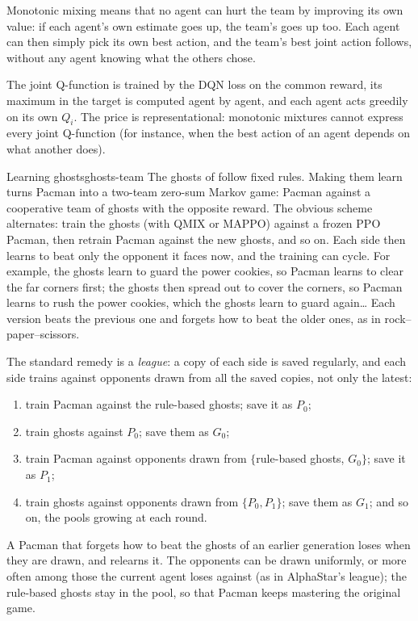 \begin{intuition}
  Monotonic mixing means that no agent can hurt the team by improving its
  own value: if each agent's own estimate goes up, the team's goes up too.
  Each agent can then simply pick its own best action, and the team's best
  joint action follows, without any agent knowing what the others chose.
\end{intuition}

The joint Q-function is trained by the DQN loss on the common reward, its
maximum in the target is computed agent by agent, and each agent acts
greedily on its own $Q_i$. The price is representational: monotonic
mixtures cannot express every joint Q-function (for instance, when the
best action of an agent depends on what another does).

\begin{pacman}{Learning ghosts}{ghosts-team}
  The ghosts of  follow fixed rules. Making them
  learn turns Pacman into a two-team zero-sum Markov game: Pacman against
  a cooperative team of ghosts with the opposite reward. The obvious scheme
  alternates: train the ghosts (with QMIX or MAPPO) against a frozen PPO
  Pacman, then retrain Pacman against the new ghosts, and so on. Each side
  then learns to beat only the opponent it faces now, and the training can
  cycle. For example, the ghosts learn to guard the power cookies, so
  Pacman learns to clear the far corners first; the ghosts then spread out
  to cover the corners, so Pacman learns to rush the power cookies, which
  the ghosts learn to guard again\dots{} Each version beats the previous
  one and forgets how to beat the older ones, as in rock--paper--scissors.

  The standard remedy is a \emph{league}: a copy of each side is saved
  regularly, and each side trains against opponents drawn from all the
  saved copies, not only the latest:
  \begin{enumerate}[nosep]
    \item train Pacman against the rule-based ghosts; save it as $P_0$;
    \item train ghosts against $P_0$; save them as $G_0$;
    \item train Pacman against opponents drawn from $\{$rule-based ghosts,
      $G_0\}$; save it as $P_1$;
    \item train ghosts against opponents drawn from $\{P_0, P_1\}$; save them
      as $G_1$; and so on, the pools growing at each round.
  \end{enumerate}
  A Pacman that forgets how to beat the ghosts of an earlier generation
  loses when they are drawn, and relearns it. The opponents can be drawn
  uniformly, or more often among those the current agent loses against
  (as in AlphaStar's league); the rule-based ghosts stay in the pool, so
  that Pacman keeps mastering the original game.
\end{pacman}

